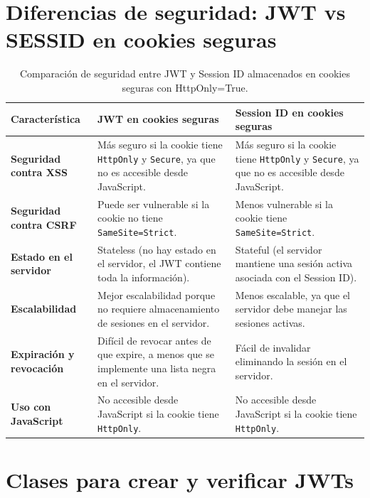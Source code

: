 \documentclass[a4paper,12pt]{report}
\begin{document}
		
		
		\section{Diferencias de seguridad: JWT vs SESSID en cookies seguras}
		\label{sec:anexo_JWTvsSESSIONS}
						
			\FloatBarrier
			\begin{table}[h]
				\centering
				\begin{tabular}{|p{4cm}|p{5cm}|p{5cm}|}
					\hline
					\textbf{Característica} & \textbf{JWT en cookies seguras} & \textbf{Session ID en cookies seguras} \\
					\hline
					\textbf{Seguridad contra XSS} & Más seguro si la cookie tiene \texttt{HttpOnly} y \texttt{Secure}, ya que no es accesible desde JavaScript. & Más seguro si la cookie tiene \texttt{HttpOnly} y \texttt{Secure}, ya que no es accesible desde JavaScript. \\
					\hline
					\textbf{Seguridad contra CSRF} & Puede ser vulnerable si la cookie no tiene \texttt{SameSite=Strict}. & Menos vulnerable si la cookie tiene \texttt{SameSite=Strict}. \\
					\hline
					\textbf{Estado en el servidor} & Stateless (no hay estado en el servidor, el JWT contiene toda la información). & Stateful (el servidor mantiene una sesión activa asociada con el Session ID). \\
					\hline
					\textbf{Escalabilidad} & Mejor escalabilidad porque no requiere almacenamiento de sesiones en el servidor. & Menos escalable, ya que el servidor debe manejar las sesiones activas. \\
					\hline
					\textbf{Expiración y revocación} & Difícil de revocar antes de que expire, a menos que se implemente una lista negra en el servidor. & Fácil de invalidar eliminando la sesión en el servidor. \\
					\hline
					\textbf{Uso con JavaScript} & No accesible desde JavaScript si la cookie tiene \texttt{HttpOnly}. & No accesible desde JavaScript si la cookie tiene \texttt{HttpOnly}. \\
					\hline
				\end{tabular}
				\caption{Comparación de seguridad entre JWT y Session ID almacenados en cookies seguras con HttpOnly=True.}
				\label{tab:jwt_vs_session}
			\end{table}
			\FloatBarrier
	
		\pagebreak
		
		
		\section{Clases para crear y verificar JWTs}
		\label{sec:anexoCreacionYverificacionJWT}
	
\end{document}

